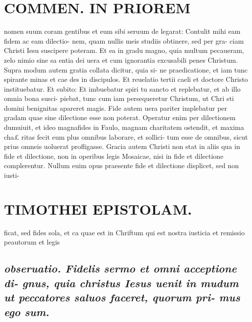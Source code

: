 \documentclass{article}
\begin{document}
\begin{pages}
\section*{COMMEN. IN PRIOREM }
\marginpar{[ p.30 ]}\pstart nomen suum coram gentibus et eum sibi seruum de legarat: Contulit mihi eam fidem ac eam dilectio- nem, quam nullis meis studiis obtinere, sed per gra- ciam Christi Iesu suscipere poteram. Et ea in gradu magno, quia multum pecaueram, zelo nimio sine sa entia dei uera et cum ignorantia excusabili penes Christum.  \pend\pstart Supra modum autem gratia collata dicitur, quia si- ne praedicatione, et iam tunc spirante minas et cae des in discipulos. Et reuelatio tertii caeli et doctore Christo instituebatur. Et subito: Et imbuebatur spiri tu sancto et replebatur, et ab illo omnia bona susci- piebat, tunc cum iam persequeretur Christum, ut Chri sti domini benignitas apareret magis.  \pend\pstart Fide autem uera pariter implebatur per gradam quae sine dilectione esse non poterat. Operatur enim per dilectionem dumuiuit, et ideo magnafides in Faulo, magnam charitatem ostendit, et maxima cha£ ritas fecit eum plus omnibus laborare, et sollici- tum esse de omnibus, sicut prius omneis uoluerat profligasse.  \pend\pstart Gracia autem Christi non stat in aliis qua in fide et dilectione, non in operibus legis Mosaicae, nisi in fide et dilectione complerentur. Nullum euim opus praesente fide et dilectione displicet, sed non iusti-  \pend
\section*{TIMOTHEI EPISTOLAM. }
\marginpar{[ p.31 ]}\pstart ficat, sed fides sola, et ca quae est in Chriftum qui est nostra iusticia et remissio peautorum et legis  \pend
{}
{}
\subsection*{\textit{obseruatio. Fidelis sermo et omni acceptione di- gnus, quia christus Iesus uenit in mudum ut peccatores saluos faceret, quorum pri- mus ego sum. }}
{}

\end{pages}
\end{document}
